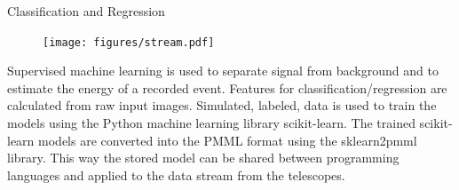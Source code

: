 \begin{multicols}{2}
    \begin{block}[]{Classification and Regression}%
      \begin{multicols}{2}
          \begin{figure}
            \texttt{[image: figures/stream.pdf]}\\
          \end{figure}
        \columnbreak
        Supervised machine learning is used to separate signal from background and to estimate
        the energy of a recorded event. 
        Features for classification/regression are calculated from raw input images.
        Simulated, labeled, data is used to train the models using the Python machine learning library scikit-learn\cite{sklearn}.
        The trained scikit-learn models are converted into the PMML\cite{pmml} format using the sklearn2pmml\cite{sklearn2pmml} library.
        This way the stored model can be shared
        between programming languages and applied to the data stream from the telescopes.
      \end{multicols}
    \end{block}%


\end{multicols}
